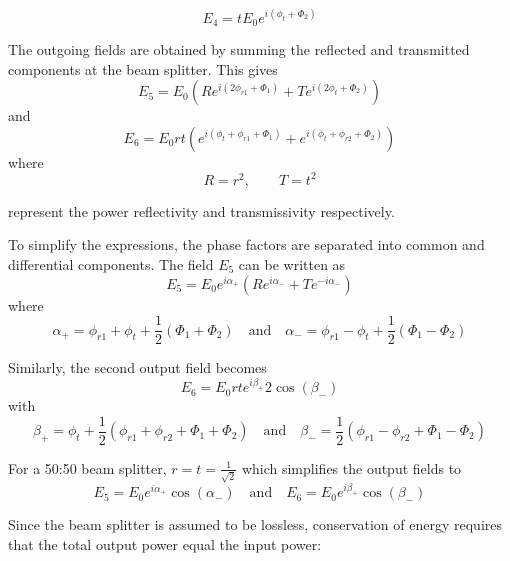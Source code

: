 \documentclass{report}
\begin{document}
\begin{equation}
E_4 = tE_0 e^{i(\phi_t+\Phi_2)}
\end{equation}

The outgoing fields are obtained by summing the reflected and transmitted components at the beam splitter. This gives
\begin{equation}
E_5 = E_0 \left(
Re^{i(2\phi_{r1}+\Phi_1)}
+
Te^{i(2\phi_t+\Phi_2)}
\right)
\end{equation}
and
\begin{equation}
E_6 = E_0 rt \left(
e^{i(\phi_t+\phi_{r1}+\Phi_1)}
+
e^{i(\phi_t+\phi_{r2}+\Phi_2)}
\right)
\end{equation}
where
\begin{equation}
R=r^2,
\qquad
T=t^2
\end{equation}

represent the power reflectivity and transmissivity respectively.

To simplify the expressions, the phase factors are separated into common and differential components. The field $E_5$ can be written as
\begin{equation}
E_5
=
E_0 e^{i\alpha_+}
\left(
Re^{i\alpha_-}
+
Te^{-i\alpha_-}
\right)
\end{equation}
where
\begin{equation}
\alpha_+
=
\phi_{r1}
+
\phi_t
+
\frac{1}{2}(\Phi_1+\Phi_2)
\quad \text{and} \quad
\alpha_-
=
\phi_{r1}
-
\phi_t
+
\frac{1}{2}(\Phi_1-\Phi_2)
\end{equation}

Similarly, the second output field becomes
\begin{equation}
E_6
=
E_0 rt e^{i\beta_+}
2\cos(\beta_-)
\end{equation}
with
\begin{equation}
\beta_+
=
\phi_t
+
\frac{1}{2}
(
\phi_{r1}
+
\phi_{r2}
+
\Phi_1
+
\Phi_2
)
\quad \text{and} \quad
\beta_-
=
\frac{1}{2}
(
\phi_{r1}
-
\phi_{r2}
+
\Phi_1
-
\Phi_2
)
\end{equation}

For a 50:50 beam splitter, $r=t=\frac{1}{\sqrt{2}}$ which simplifies the output fields to
\begin{equation}
E_5
=
E_0 e^{i\alpha_+}\cos(\alpha_-)
\quad \text{and} \quad
E_6
=
E_0 e^{i\beta_+}\cos(\beta_-)
\end{equation}

Since the beam splitter is assumed to be lossless, conservation of energy requires that the total output power equal the input power:
\end{document}
